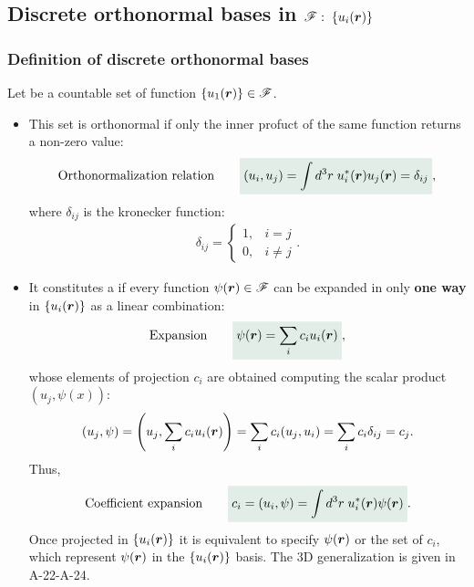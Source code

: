 \subsection{Discrete orthonormal bases in $\mathscr{F}:\;\{u_i(\bm{r})\}$}
\subsubsection{Definition of discrete orthonormal bases}
Let be a countable set of function $\{u_1(\bm{r})\}\in\mathscr{F}$. 
\begin{itemize}[itemsep=0pt,topsep=0pt]
    \item This set is orthonormal if only the inner profuct of the same function returns a non-zero value:
        \begin{align}
            \text{Orthonormalization relation}\qquad\highlight{(u_i,u_j)=\int d^3r\;u_i^*(\bR)u_j(\bR)=\delta_{ij}},
            \label{eq:introduction_orthonormalizationrelationdiscreteu}
        \end{align}
        where $\delta_{ij}$ is the kronecker function:
        \begin{align}
            \delta_{ij}=\begin{cases}
                1,&i=j\\
                0,&i\neq j
            \end{cases}.
        \end{align}
    \item It constitutes a  if every function $\psi(\bm{r})\in\mathscr{F}$ can be expanded in only \textbf{one way} in $\{u_i(\bm{r})\}$ as a linear combination:
    \begin{align}
        \text{Expansion}\qquad\highlight{\psi(\bR)=\sum_ic_iu_i(\bR)}, 
        \label{eq:introduction_expansionfunction}   
    \end{align}
    whose elements of projection $c_i$ are obtained computing the scalar product $(u_j,\psi(x))$:
    \begin{align*}
        (u_j,\psi)=\left(u_j,\sum_ic_iu_i(\bm{r})\right)=\sum_ic_i(u_j,u_i)=\sum_ic_i\delta_{ij}=c_j.
    \end{align*}
    Thus,
    \begin{align}
        \text{Coefficient expansion}\qquad\highlight{c_i=(u_i,\psi)=\int d^3r\;u_i^*(\bR)\psi(\bR)}.
        \label{eq:introduction_expansioncoefficients}  
    \end{align}
    Once projected in $\{u_i(\bm{r})\}$ it is equivalent to specify $\psi(\bm{r})$ or the set of $c_i$, which represent $\psi(\bm{r})$ in the $\{u_i(\bm{r})\}$ basis.
    The 3D generalization is given in A-22-A-24.
\end{itemize}

